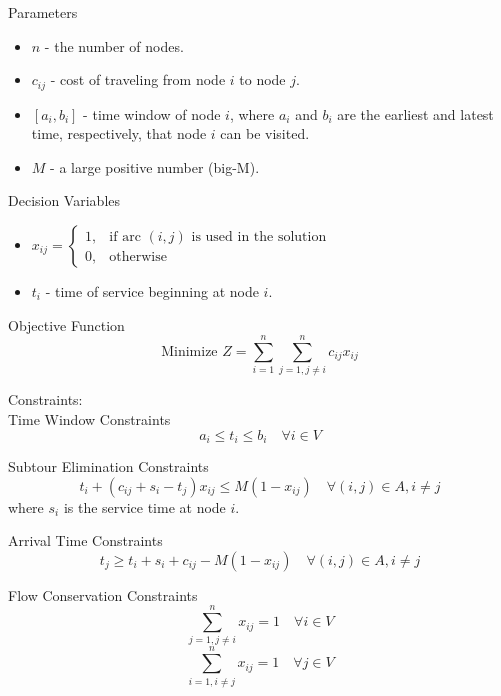 Parameters
\begin{itemize}
  \item $n$ - the number of nodes.
  \item $c_{ij}$ - cost of traveling from node $i$ to node $j$.
  \item $[a_i, b_i]$ - time window of node $i$, where $a_i$ and $b_i$ are the earliest and latest time, respectively, that node $i$ can be visited.
  \item $M$ - a large positive number (big-M).
\end{itemize}

Decision Variables
\begin{itemize}
  \item $x_{ij} = 
    \begin{cases} 
      1, & \text{if arc $(i,j)$ is used in the solution} \\
      0, & \text{otherwise}
    \end{cases}$
  \item $t_i$ - time of service beginning at node $i$.
\end{itemize}

Objective Function
\begin{equation}
\text{Minimize } Z = \sum_{i=1}^{n}\sum_{j=1, j \neq i}^{n} c_{ij} x_{ij}
\end{equation}

Constraints:\\
Time Window Constraints
\begin{equation}
a_i \leq t_i \leq b_i \quad \forall i \in V
\end{equation}

Subtour Elimination Constraints
\begin{equation}
t_i + (c_{ij} + s_i - t_j) x_{ij} \leq M(1 - x_{ij}) \quad \forall (i,j) \in A, i \neq j
\end{equation}
where $s_i$ is the service time at node $i$.

Arrival Time Constraints
\begin{equation}
t_j \geq t_i + s_i + c_{ij} - M(1 - x_{ij}) \quad \forall (i,j) \in A, i \neq j
\end{equation}

Flow Conservation Constraints
\begin{equation}
\sum_{j=1, j \neq i}^{n} x_{ij} = 1 \quad \forall i \in V
\end{equation}
\begin{equation}
\sum_{i=1, i \neq j}^{n} x_{ij} = 1 \quad \forall j \in V
\end{equation}

